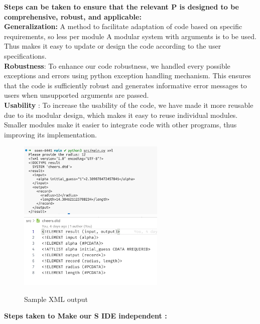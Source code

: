 \noindent\large\textbf{Steps can be taken to ensure that the relevant P is designed to be comprehensive, robust, and applicable:} \\
\newline\textbf{ Generalization:} A method to facilitate adaptation of code based on specific requirements, so less per module A modular system with arguments is to be used. Thus makes it easy to update or design the code according to the user specifications.\\
\textbf{Robustness}: To enhance our  code robustness, we handled every possible exceptions and errors using python exception handling mechanism. This ensures that the code is sufficiently robust and generates informative error messages to users when unsupported arguments are passed.\\
\textbf{Usability} : To increase the usability of the code, we have made it more reusable due to its modular design, which makes it easy to reuse individual modules. Smaller modules make it easier to integrate code with other programs, thus improving its implementation.\\

 \begin{figure}[h]
    \centering
    \includegraphics[width=7cm]{images/xml.png}
    \includegraphics[width=7cm]{images/dtd.png}
    \caption{Sample XML output}
    \label{fig:xml}
\end{figure}
 

\noindent\textbf{Steps taken to Make our S IDE independent :}\\


